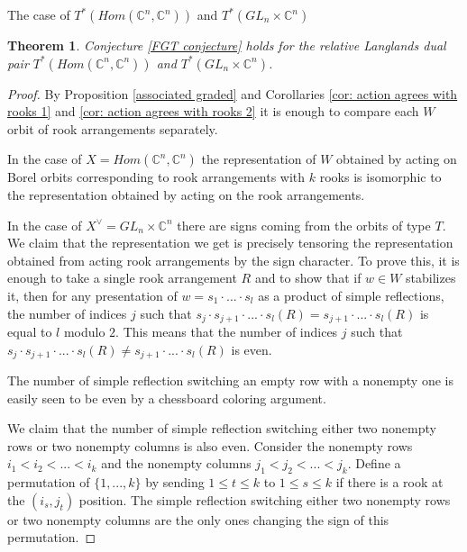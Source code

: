 \documentclass[12pt]{article}
\newcommand{\C}{\mathbb{C}}
\theoremstyle{plain}
\newtheorem{theorem}{Theorem}[section]
\theoremstyle{definition}
\begin{document}
\begin{subsection}{The case of $T^*(Hom(\C^n,\C^n))$ and $T^*(GL_n\times \C^n)$}
      \begin{theorem}\label{first example}
        Conjecture \ref{FGT conjecture} holds for the relative Langlands dual pair $T^*(Hom(\C^n,\C^n))$ and $T^*(GL_n\times \C^n)$.
    \end{theorem}

    \begin{proof}
    By Proposition \ref{associated graded} and Corollaries \ref{cor: action agrees with rooks 1} and \ref{cor: action agrees with rooks 2} it is enough to compare each $W$ orbit of rook arrangements separately.

    In the case of $X=Hom(\C^n,\C^n)$ the representation of $W$ obtained by acting on Borel orbits corresponding to rook arrangements with $k$ rooks is isomorphic to the representation obtained by acting on the rook arrangements.
    
    In the case of $X^\vee=GL_n\times \C^n$ there are signs coming from the orbits of type $T$. We claim that the representation we get is precisely tensoring the representation obtained from acting rook arrangements by the sign character. To prove this, it is enough to take a single rook arrangement $R$ and to show that if $w\in W$ stabilizes it, then for any presentation of $w=s_1\cdot ...\cdot s_l$ as a product of simple reflections, the number of indices $j$ such that $s_j\cdot s_{j+1}\cdot ...\cdot s_l (R)= s_{j+1}\cdot ...\cdot s_l (R)$ is equal to $l$ modulo $2$.  This means that the number of indices $j$ such that $s_j\cdot s_{j+1}\cdot ...\cdot s_l (R)\neq s_{j+1}\cdot ...\cdot s_l (R)$ is even. 
    
    The number of simple reflection switching an empty row with a nonempty one is easily seen to be even by a chessboard coloring argument. 
    
    We claim that the number of simple reflection switching either two nonempty rows or two nonempty columns is also even. Consider the nonempty rows $i_1<i_2<...<i_k$ and the nonempty columns $j_1<j_2<...<j_k$. Define a permutation of $\{1,...,k\}$ by sending $1\leq t\leq k$ to $1\leq s\leq k$ if there is a rook at the $(i_s,j_t)$ position. 
    The simple reflection switching either two nonempty rows or two nonempty columns are the only ones changing the sign of this permutation.
    \end{proof}
    
    
    
\end{subsection}
\end{document}
